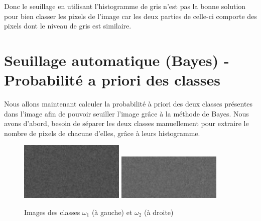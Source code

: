 \documentclass[a4paper,11pt]{article}
\begin{document}
  
  Donc le seuillage en utilisant l'histogramme de gris n'est pas la bonne solution pour 
  bien classer les pixels de l'image car les deux parties de celle-ci comporte des pixels
  dont le niveau de gris est similaire.
  
  \section{Seuillage automatique (Bayes) - Probabilité a priori des classes}
  Nous allons maintenant calculer la probabilité à priori des deux classes présentes dans l'image
  afin de pouvoir seuiller l'image grâce à la méthode de Bayes. Nous avons d'abord, besoin de séparer
  les deux classes manuellement pour extraire le nombre de pixels de chacune d'elles, grâce à leurs 
  histogramme.\\
  
  \begin{figure}[H]
    \center
    \includegraphics[width=5cm]{2classes_100_100_8bits_omega1.png}
    \includegraphics[width=5cm]{2classes_100_100_8bits_omega2.png}
    \caption{Images des classes $\omega_{1}$ (à gauche) et $\omega_{2}$ (à droite)}
  \end{figure}
  
\end{document}
